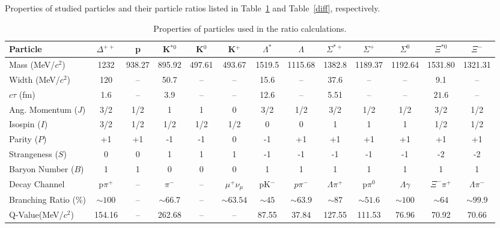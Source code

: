 Properties of studied particles and their particle ratios listed in Table~\ref{opt} and Table~\ref{diff}, respectively. 

\hspace*{-1cm}
\begin{table}[!htb] 
\hspace*{-1cm}
\caption{\label{opt} Properties of particles used in the ratio calculations.}
%
\hspace*{-1cm}
%
 \begin{tabular}{lcccccccccccc}
\hline
\hline
Particle&$\Delta^{++}$ &  p & K$^{*0}$ &K$^{0} $ &K$^{+} $ & $\Lambda^{*}$ & $\Lambda$& $\Sigma^{*+}$  & $\Sigma^{+}$ & $\Sigma^{0}$ & $\Xi^{*0}$ & $\Xi^{-}$\\
\hline
Mass (MeV/$c^{2}$)&1232&938.27&895.92&497.61&493.67&1519.5&1115.68&1382.8&1189.37&1192.64&1531.80&1321.31\\
Width (MeV/$c^{2}$)&120&--&50.7&--&--&15.6&--&37.6&--&--&9.1&--\\
$c\tau$ (fm)&1.6&--&3.9&--&--&12.6&--&5.51&--&--&$21.6$&--\\
Ang. Momentum ($J$)&3/2&1/2&1&1&0&3/2&1/2&3/2&1/2&1/2&3/2&1/2\\
Isospin ($I$)&3/2&1/2&1/2&1/2&1/2&0&0&1&1&1&1/2&1/2\\
Parity ($P$)&+1&+1&-1&-1&0&-1&+1&+1&+1&+1&+1&+1\\
Strangeness ($S$)&0&0&1&1&1&-1&-1&-1&-1&-1&-2&-2\\
Baryon Number ($B$)&1&1&0&0&0&1&1&1&1&1&1&1\\
Decay Channel&p$\pi^{+}$&--&$\pi^{-}$&--&$\mu^{+}\nu_{\mu}$&pK$^{-}$&$p\pi^{-}$&$\Lambda\pi^{+}$&p$\pi^{0}$&$\Lambda\gamma$&$\Xi^{-}\pi^{+}$&$\Lambda\pi^{-}$\\
Branching Ratio (\%)&$\sim100$&--&$\sim66.7$&--&$\sim63.54$&$\sim45$&$\sim63.9$&$\sim87$&$\sim51.6$&$\sim100$&$\sim64$&$\sim99.9$\\
Q-Value(MeV/$c^{2}$)&154.16&--&262.68&--&--&87.55&37.84&127.55&111.53&76.96&70.92&70.66\\
 \hline
 \hline
\end{tabular}
\end{table}

